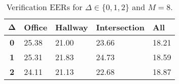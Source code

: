 \begin{table}[h]
    \centering
    \begin{tabular}{|c|M{2cm}|M{2cm}|M{2cm}|M{2cm}|}
    \hline
    $\boldsymbol{\Delta}$ & \bf{Office} & \bf{Hallway} & \bf{Intersection} & \bf{All} \\ 
    \hline 
    \hline
    \bf{0} & 25.38 & 21.00 & 23.66 & 18.21 \\
    \hline
    \bf{1} & 25.31 & 21.83 & 24.73 & 18.59 \\
    \hline
    \bf{2} & 24.11 & 21.13 & 22.68 & 18.87 \\
    \hline
    \end{tabular}
    \caption{Verification EERs for $\Delta \in \{0, 1, 2\}$ and $M = 8$.}
    \label{tab:verify_adapted_m_M_8}
\end{table}
